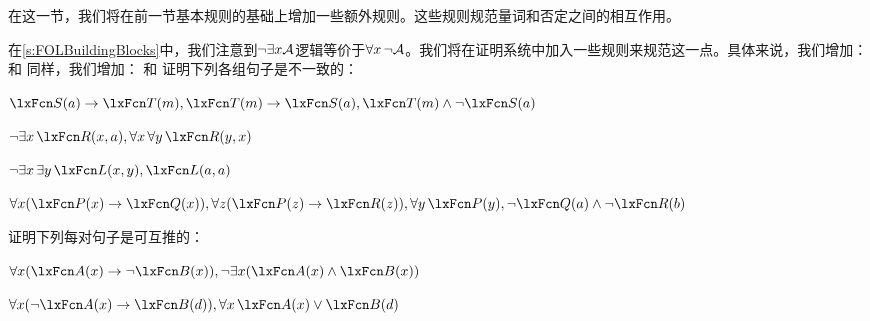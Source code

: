 在这一节，我们将在前一节基本规则的基础上增加一些额外规则。这些规则规范量词和否定之间的相互作用。

在\cref{s:FOLBuildingBlocks}中，我们注意到$\neg\exists x\mathcal{A}$逻辑等价于$\forall x\, \neg\mathcal{A}$。我们将在证明系统中加入一些规则来规范这一点。具体来说，我们增加：
和
同样，我们增加：
和
\practiceproblems
\problempart
证明下列各组句子是不一致的：

\begin{compactlist}
\item $\atom{S}{a}\eif \atom{T}{m}, \atom{T}{m} \eif \atom{S}{a}, \atom{T}{m} \eand \enot \atom{S}{a}$
\item $\enot\exists x\,\atom{R}{x,a}, \forall x\, \forall y\,\atom{R}{y,x}$
\item $\enot\exists x\, \exists y\,\atom{L}{x,y}, \atom{L}{a,a}$
\item $\forall x(\atom{P}{x} \eif \atom{Q}{x}), \forall z(\atom{P}{z} \eif \atom{R}{z}), \forall y\,\atom{P}{y}, \enot \atom{Q}{a} \eand \enot \atom{R}{b}$
\end{compactlist}

\problempart
证明下列每对句子是可互推的：

\begin{compactlist}
\item $\forall x (\atom{A}{x}\eif \enot \atom{B}{x}), \enot\exists x(\atom{A}{x} \eand \atom{B}{x})$
\item $\forall x (\enot\atom{A}{x}\eif \atom{B}{d}), \forall x\,\atom{A}{x} \eor \atom{B}{d}$
\end{compactlist}


